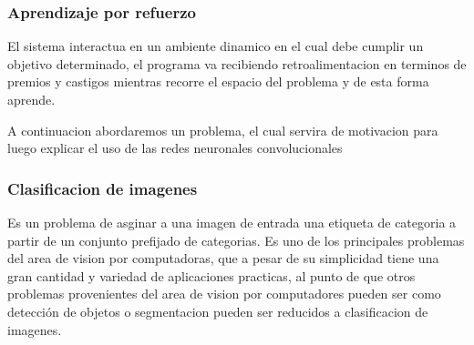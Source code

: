 \documentclass[a4paper,10pt]{article}
\begin{document}
\subsubsection{Aprendizaje por refuerzo}
El sistema interactua en un ambiente dinamico en el cual debe cumplir un objetivo determinado, el programa va recibiendo retroalimentacion en terminos de premios y castigos mientras 
recorre el espacio del problema y de esta forma aprende.

\pagebreak

A continuacion abordaremos un problema, el cual servira de motivacion para luego explicar el uso de las redes neuronales convolucionales

\subsubsection{Clasificacion de imagenes }
Es un problema de asginar a una imagen de entrada una etiqueta de categoria a partir de un conjunto prefijado de categorias.
Es uno de los principales problemas del area de vision por computadoras, que a pesar de su simplicidad tiene una gran cantidad y variedad de aplicaciones practicas, 
al punto de que otros problemas provenientes del area de vision por computadores pueden ser como detección de objetos o segmentacion pueden ser reducidos a clasificacion de imagenes.
\end{document}
